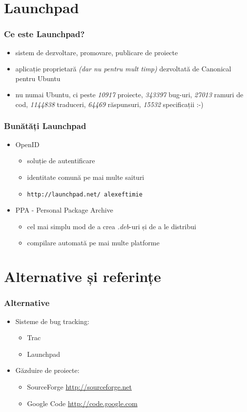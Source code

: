 \documentclass{beamer}
\begin{document}
\section{Launchpad}
\frame{\tableofcontents[currentsection]}

\begin{frame}
\frametitle{Ce este Launchpad?}
\begin{itemize}
\pause \item sistem de dezvoltare, promovare, publicare de proiecte
\pause \item aplicație proprietară \emph{(dar nu pentru mult timp)} dezvoltată de Canonical pentru Ubuntu
\pause \item nu numai Ubuntu, ci peste \emph{10917} proiecte, \emph{343397} bug-uri, \emph{27013} ramuri de cod, \emph{1144838} traduceri, \emph{64469} răspunsuri, \emph{15532} specificații :-)
\end{itemize}
\end{frame} 


\begin{frame}
\frametitle{Bunătăți Launchpad}
\begin{itemize}
\item OpenID
\begin{itemize}
\item soluție de autentificare
\item identitate comună pe mai multe saituri
\item \texttt{http://launchpad.net/~alexeftimie}
\end{itemize}
\item PPA - Personal Package Archive
\begin{itemize}
\item cel mai simplu mod de a crea \emph{.deb}-uri și de a le distribui
\item compilare automată pe mai multe platforme
\end{itemize}
\end{itemize}
\end{frame}

\section {Alternative și referințe}
\frame{\tableofcontents[currentsection]}

\begin{frame}
\frametitle{Alternative}
\begin{itemize}
\item Sisteme de bug tracking:
\begin{itemize}
\item Trac
\item Launchpad
\end{itemize}
\item Găzduire de proiecte:
\begin{itemize}
\item SourceForge \url{http://sourceforge.net}
\item Google Code \url{http://code.google.com}
\end{itemize}
\end{itemize}
\end{frame}
\end{document}
